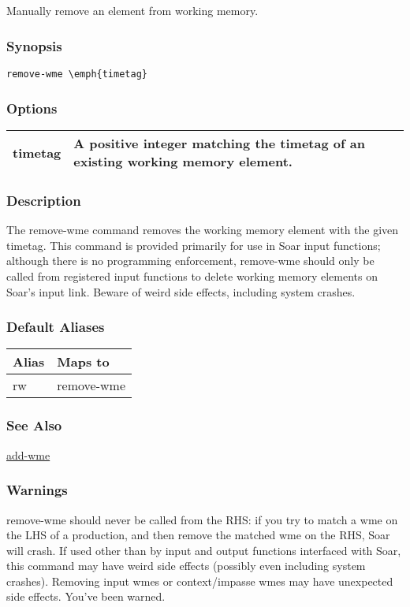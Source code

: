 \subsection{}
\label{remove-wme}
Manually remove an element from working memory. 
\subsubsection*{Synopsis}
\begin{verbatim}
remove-wme \emph{timetag}
\end{verbatim}
\subsubsection*{Options}
\begin{tabular}{|l|l|}
\hline 
 timetag  & A positive integer matching the timetag of an existing working memory element.  \\
 \hline 
\end{tabular}
\subsubsection*{Description}
 The remove-wme command removes the working memory element with the given timetag. This command is provided primarily for use in Soar input functions; although there is no programming enforcement, remove-wme should only be called from registered input functions to delete working memory elements on Soar's input link. 
 Beware of weird side effects, including system crashes. 
\subsubsection*{Default Aliases}
\begin{tabular}{|l|l|}
\hline 
 Alias  & Maps to  \\
 \hline 
 rw  & remove-wme  \\
 \hline 
\end{tabular}
\subsubsection*{See Also}
\hyperref[add-wme]{add-wme} \subsubsection*{Warnings}
 remove-wme should never be called from the RHS: if you try to match a wme on the LHS of a production, and then remove the matched wme on the RHS, Soar will crash. 
 If used other than by input and output functions interfaced with Soar, this command may have weird side effects (possibly even including system crashes). Removing input wmes or context/impasse wmes may have unexpected side effects. You've been warned. 

